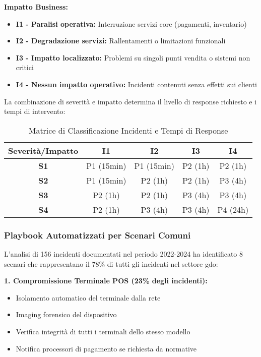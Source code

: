 \textbf{Impatto Business:}
\begin{itemize}
\item \textbf{I1 - Paralisi operativa:} Interruzione servizi core (pagamenti, inventario)
\item \textbf{I2 - Degradazione servizi:} Rallentamenti o limitazioni funzionali
\item \textbf{I3 - Impatto localizzato:} Problemi su singoli punti vendita o sistemi non critici
\item \textbf{I4 - Nessun impatto operativo:} Incidenti contenuti senza effetti sui clienti
\end{itemize}

La combinazione di severità e impatto determina il livello di response richiesto e i tempi di intervento:

\begin{table}[htbp]
\centering
\caption{Matrice di Classificazione Incidenti e Tempi di Response}
\label{tab:incident_classification}
\begin{tabular}{c|cccc}
\toprule
\textbf{Severità/Impatto} & \textbf{I1} & \textbf{I2} & \textbf{I3} & \textbf{I4} \\
\midrule
\textbf{S1} & P1 (15min) & P1 (15min) & P2 (1h) & P2 (1h) \\
\textbf{S2} & P1 (15min) & P2 (1h) & P2 (1h) & P3 (4h) \\
\textbf{S3} & P2 (1h) & P2 (1h) & P3 (4h) & P3 (4h) \\
\textbf{S4} & P2 (1h) & P3 (4h) & P3 (4h) & P4 (24h) \\
\bottomrule
\end{tabular}
\end{table}

\subsubsection{Playbook Automatizzati per Scenari Comuni}

L'analisi di 156 incidenti documentati nel periodo 2022-2024 ha identificato 8 scenari che rappresentano il 78\% di tutti gli incidenti nel settore \gls{gdo}:

\textbf{1. Compromissione Terminale POS (23\% degli incidenti):}
\begin{itemize}
\item Isolamento automatico del terminale dalla rete
\item Imaging forensico del dispositivo
\item Verifica integrità di tutti i terminali dello stesso modello
\item Notifica processori di pagamento se richiesta da normative
\end{itemize}

